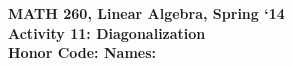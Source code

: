 \documentclass{article}
\begin{document}
\begin{flushleft}
	\bfseries{MATH 260, Linear Algebra, Spring `14}\\
	\bfseries{Activity 11:  Diagonalization}\\
	\bfseries{Honor Code:} \hspace{3.5in}\bfseries{Names:}\\
\end{flushleft}
\begin{flushleft}
%
%
%
%
%

\end{flushleft}
\end{document}
